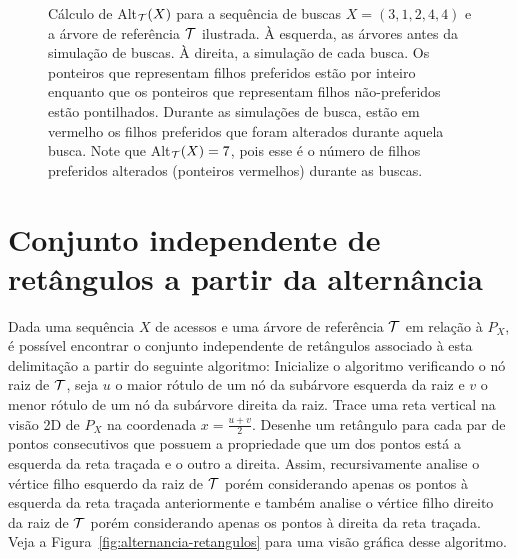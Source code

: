 \begin{figure}
    
    \caption{Cálculo de Alt$_{\mathcal{T}}(X)$ para a sequência de buscas $X = (3,1,2,4,4)$ e a árvore de referência $\mathcal{T}$ ilustrada. À esquerda, as árvores antes da simulação de buscas. À direita, a simulação de cada busca. Os ponteiros que representam filhos preferidos estão por inteiro enquanto que os ponteiros que representam filhos não-preferidos estão pontilhados. Durante as simulações de busca, estão em vermelho os filhos preferidos que foram alterados durante aquela busca. Note que Alt$_{\mathcal{T}}(X) = 7$, pois esse é o número de filhos preferidos alterados (ponteiros vermelhos) durante as buscas.}
\label{fig:alternancia_abordagem_informal}
\end{figure}

\section{Conjunto independente de retângulos a partir da alternância}

Dada uma sequência $X$ de acessos e uma árvore de referência $\mathcal{T}$ em relação à $P_X$, é possível encontrar o conjunto independente de retângulos associado à esta delimitação a partir do seguinte algoritmo: Inicialize o algoritmo verificando o nó raiz de $\mathcal{T}$, seja $u$ o maior rótulo de um nó da subárvore esquerda da raiz e $v$ o menor rótulo de um nó da subárvore direita da raiz. Trace uma reta vertical na visão 2D de $P_X$ na coordenada $x = \frac{u + v}{2}$. Desenhe um retângulo para cada par de pontos consecutivos que possuem a propriedade que um dos pontos está a esquerda da reta traçada e o outro a direita. Assim, recursivamente analise o vértice filho esquerdo da raiz de $\mathcal{T}$ porém considerando apenas os pontos à esquerda da reta traçada anteriormente e também analise o vértice filho direito da raiz de $\mathcal{T}$ porém considerando apenas os pontos à direita da reta traçada. Veja a Figura~\ref{fig:alternancia-retangulos} para uma visão gráfica desse algoritmo.

